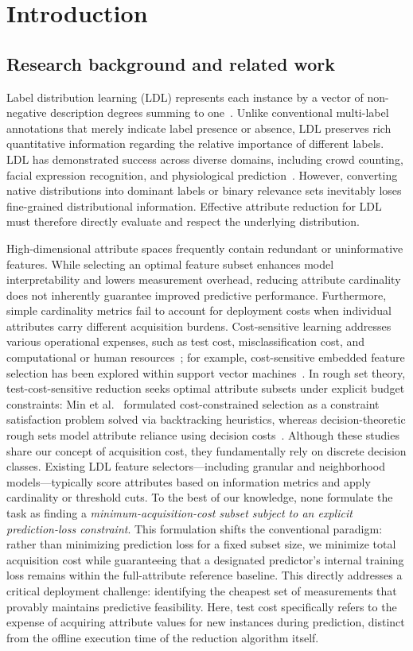 \section{Introduction}
\label{sec:introduction}
\subsection{Research background and related work}
Label distribution learning (LDL) represents each instance by a vector of non-negative description degrees summing to one~\cite{G1}. Unlike conventional multi-label annotations that merely indicate label presence or absence, LDL preserves rich quantitative information regarding the relative importance of different labels. LDL has demonstrated success across diverse domains, including crowd counting, facial expression recognition, and physiological prediction~\cite{ZW1,LS,QH}. However, converting native distributions into dominant labels or binary relevance sets inevitably loses fine-grained distributional information. Effective attribute reduction for LDL must therefore directly evaluate and respect the underlying distribution.

High-dimensional attribute spaces frequently contain redundant or uninformative features. While selecting an optimal feature subset enhances model interpretability and lowers measurement overhead, reducing attribute cardinality does not inherently guarantee improved predictive performance. Furthermore, simple cardinality metrics fail to account for deployment costs when individual attributes carry different acquisition burdens. Cost-sensitive learning addresses various operational expenses, such as test cost, misclassification cost, and computational or human resources~\cite{Turney2000}; for example, cost-sensitive embedded feature selection has been explored within support vector machines~\cite{AL}. In rough set theory, test-cost-sensitive reduction seeks optimal attribute subsets under explicit budget constraints: Min et al.~\cite{Min2014TestCost} formulated cost-constrained selection as a constraint satisfaction problem solved via backtracking heuristics, whereas decision-theoretic rough sets model attribute reliance using decision costs~\cite{Jia2013MinCost}. Although these studies share our concept of acquisition cost, they fundamentally rely on discrete decision classes. Existing LDL feature selectors—including granular and neighborhood models—typically score attributes based on information metrics and apply cardinality or threshold cuts. To the best of our knowledge, none formulate the task as finding a \emph{minimum-acquisition-cost subset subject to an explicit prediction-loss constraint}. This formulation shifts the conventional paradigm: rather than minimizing prediction loss for a fixed subset size, we minimize total acquisition cost while guaranteeing that a designated predictor's internal training loss remains within the full-attribute reference baseline. This directly addresses a critical deployment challenge: identifying the cheapest set of measurements that provably maintains predictive feasibility. Here, test cost specifically refers to the expense of acquiring attribute values for new instances during prediction, distinct from the offline execution time of the reduction algorithm itself.

